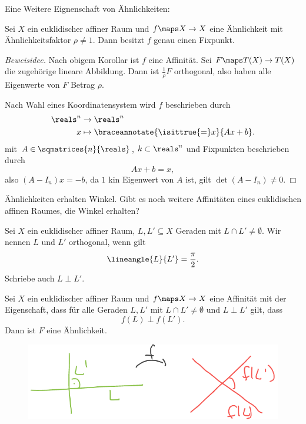 Eine Weitere Eignenschaft von Ähnlichkeiten:
\begin{satz}
  Sei \( X \) ein euklidischer affiner Raum und \( f\maps X\to X \) eine Ähnlichkeit mit Ähnlichkeitsfaktor \( \rho\neq 1 \). Dann besitzt \( f \) genau einen Fixpunkt.
\end{satz}
\begin{proof}[Beweisidee]
  Nach obigem Korollar ist \( f \) eine Affinität. Sei \( F\maps T(X)\to T(X) \) die zugehörige lineare Abbildung. Dann ist \( \frac{1}{\rho} F \) orthogonal, also haben alle Eigenwerte von \( F \) Betrag \( \rho \). 

  Nach Wahl eines Koordinatensystem wird \( f \) beschrieben durch
  \begin{align*}
    \reals^n&\to \reals^n\\
    x&\mapsto \braceannotate{\isittrue{=}x}{Ax+b}.
  \end{align*}
  mit \( A\in \sqmatrices{n}{\reals} \), \( k\subset \reals^n \) und Fixpunkten beschrieben durch
  \begin{equation*}
    Ax+b=x,
  \end{equation*}
  also \( (A-I_n)x=-b \), da \( 1 \) kin Eigenwert von \( A \) ist, gilt \( \det(A-I_n)\neq 0 \).
\end{proof}
Ähnlichkeiten erhalten Winkel. Gibt es noch weitere Affinitäten eines euklidischen affinen Raumes, die Winkel erhalten?
\begin{definition*}
  Sei \( X \) ein euklidischer affiner Raum, \( L,L'\subseteq X \) Geraden mit \( L\cap L'\neq \emptyset \). Wir nennen \( L \) und \( L' \) orthogonal, wenn gilt
  \begin{equation*}
    \lineangle{L}{L'}=\frac{\pi}{2}.
  \end{equation*}
  Schriebe auch \( L\perp L' \).
\end{definition*}
\begin{satz}\label{nur_aehnlichkeiten_erhalten_rechte_winkel}
  Sei \( X \) ein euklidischer affiner Raum und \( f\maps X\to X \) eine Affinität mit der Eigenschaft, dass für alle Geraden \( L,L' \) mit \( L\cap L'\neq \emptyset \) und \( L\perp L' \) gilt, dass
  \begin{equation*}
    f(L)\perp f(L').
  \end{equation*}
  Dann ist \( F \) eine Ähnlichkeit.
  \begin{figure}[H]
    \centering
    \includegraphics[width=0.5\linewidth]{figures/rechte_winkel_erhalten}
    \label{fig:rechte_winkel_erhalten}
  \end{figure}
\end{satz}
